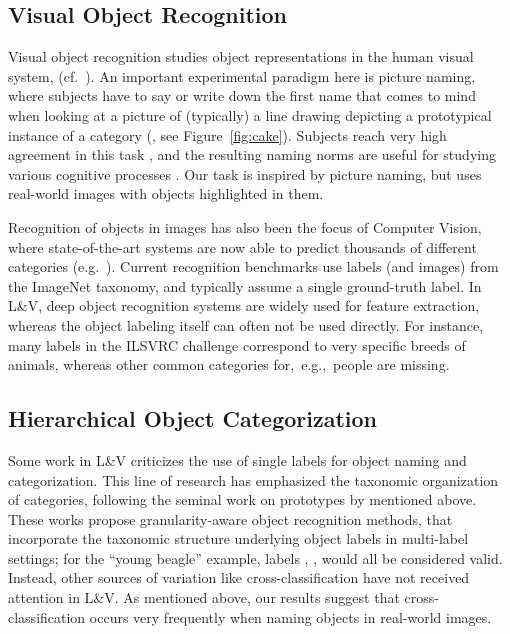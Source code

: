 \subsection{Visual Object Recognition}

Visual object recognition studies object representations in the human visual system, (cf.\ ). 
An important experimental paradigm here is picture naming, where subjects have to say or write down the first name that comes to mind when looking at a picture of (typically) a line drawing depicting a prototypical instance of a category (, see Figure\ \ref{fig:cake}).
Subjects reach very high agreement in this task \cite{rossion2004revisiting}, and the resulting naming norms are useful for studying various cognitive processes \cite{humphreys1988cascade}.
Our task is inspired by picture naming, but uses real-world images with objects highlighted in them.

Recognition of objects in images has also been the focus of Computer Vision, where state-of-the-art systems are now able to predict thousands of different categories (e.g.\ ). 
Current recognition benchmarks use labels (and images) from the ImageNet \cite{imagenet_cvpr09} taxonomy, and typically assume a single ground-truth label.
In L\&V, deep object recognition systems are widely used for feature extraction, whereas the object labeling itself can often not be used directly. For instance, many labels in the ILSVRC  challenge \cite{ILSVRC15} correspond to very specific breeds of animals, whereas other common categories for,\ e.g.,\ people are missing.

\subsection{Hierarchical Object Categorization}

Some work in L\&V \cite{deng2014large,wang2014poodle,peterson2018learning} criticizes the use of single labels for object naming and categorization.
This line of research has emphasized the taxonomic organization of categories, following the seminal work on prototypes by  mentioned above.
These works propose granularity-aware object recognition methods, that incorporate the taxonomic structure underlying object labels in multi-label settings; for the ``young beagle'' example, labels , ,  would all be considered valid.
Instead, other sources of variation like cross-classification have not received attention in L\&V.
As mentioned above, our results suggest that cross-classification occurs very frequently when naming objects in real-world images.

